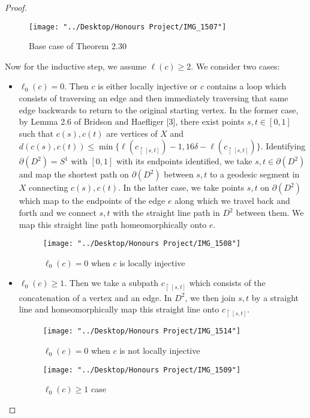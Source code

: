 \documentclass[12pt]{article}
\newcommand{\vs}{\vskip10pt}
\begin{document}
\begin{proof}
\begin{figure} [H]
	\centering
	\texttt{[image: "../Desktop/Honours Project/IMG\_1507"]}
	\caption{Base case of Theorem 2.30}
	\label{fig:img1507}
\end{figure}
		\vs 
		
		Now for the inductive step, we assume $\ell(c) \geq 2$. We consider two cases: 
		
		\begin{itemize}
			\item $\ell_0(c) = 0$. Then $c$ is either locally injective or $c$ contains a loop which consists of traversing an edge and then immediately traversing that same edge backwards to return to the original starting vertex. In the former case, by Lemma 2.6 of Bridson and Haefliger [3], there exist points $s,t \in [0,1]$ such that $c(s), c(t)$ are vertices of $X$ and $d(c(s), c(t)) \leq \min \{\ell(c_{\restriction [s,t]}) - 1, 16 \delta - \ell(c_{\restriction [s,t]})\}$. Identifying $\partial (D^2) = S^1$ with $[0,1]$ with its endpoints identified, we take $s,t \in \partial(D^2)$ and map the shortest path on $\partial(D^2)$ between $s,t$ to a geodesic segment in $X$ connecting $c(s), c(t)$. In the latter case, we take points $s,t$ on $\partial(D^2)$ which map to the endpoints of the edge $e$ along which we travel back and forth and we connect $s,t$ with the straight line path in $D^2$ between them. We map this straight line path homeomorphically onto $e$. 
			
\begin{figure} [H]
	\centering
	\texttt{[image: "../Desktop/Honours Project/IMG\_1508"]}
	\caption{$\ell_0(c) = 0$ when $c$ is locally injective}
	\label{fig:img1508}
\end{figure}
			\item $\ell_0(c) \geq 1$. Then we take a subpath $c_{\restriction [s,t]}$ which consists of the concatenation of a vertex and an edge. In $D^2$, we then join $s,t$ by a straight line and homeomorphically map this straight line onto $c_{\restriction [s,t]}$. 
			
			\begin{figure} [H]
				\centering
				\texttt{[image: "../Desktop/Honours Project/IMG\_1514"]}
				\caption{$\ell_0(c) = 0$ when $c$ is not locally injective}
				\label{fig:img1514}
			\end{figure}
			
\begin{figure} [H]
	\centering
	\texttt{[image: "../Desktop/Honours Project/IMG\_1509"]}
	\caption{$\ell_0(c) \geq 1$ case}
	\label{fig:img1509}
\end{figure}
		\end{itemize}
	

\end{proof}
\end{document}
